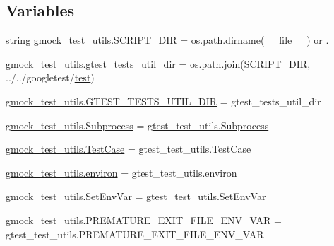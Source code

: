 \subsection*{Variables}
\begin{DoxyCompactItemize}
\item 
string \mbox{\hyperlink{namespacegmock__test__utils_a4ef94affd9d889f78d67be80017eeddd}{gmock\+\_\+test\+\_\+utils.\+S\+C\+R\+I\+P\+T\+\_\+\+D\+IR}} = os.\+path.\+dirname(\+\_\+\+\_\+file\+\_\+\+\_\+) or \textquotesingle{}.\textquotesingle{}
\item 
\mbox{\hyperlink{namespacegmock__test__utils_af6d94170502149e7f99cfa73ddc13c00}{gmock\+\_\+test\+\_\+utils.\+gtest\+\_\+tests\+\_\+util\+\_\+dir}} = os.\+path.\+join(S\+C\+R\+I\+P\+T\+\_\+\+D\+IR, \textquotesingle{}../../googletest/\mbox{\hyperlink{_mutual_8h_a707ee03719e99670bf6cfdfd897b8456}{test}}\textquotesingle{})
\item 
\mbox{\hyperlink{namespacegmock__test__utils_ae7ee9324ba489b3cbd99c5e26006eba9}{gmock\+\_\+test\+\_\+utils.\+G\+T\+E\+S\+T\+\_\+\+T\+E\+S\+T\+S\+\_\+\+U\+T\+I\+L\+\_\+\+D\+IR}} = gtest\+\_\+tests\+\_\+util\+\_\+dir
\item 
\mbox{\hyperlink{namespacegmock__test__utils_a31a0e33565ec805d314cb0a4eb8317e6}{gmock\+\_\+test\+\_\+utils.\+Subprocess}} = \mbox{\hyperlink{classgtest__test__utils_1_1_subprocess}{gtest\+\_\+test\+\_\+utils.\+Subprocess}}
\item 
\mbox{\hyperlink{namespacegmock__test__utils_a959c5af591e4d49b6d35745205b64509}{gmock\+\_\+test\+\_\+utils.\+Test\+Case}} = gtest\+\_\+test\+\_\+utils.\+Test\+Case
\item 
\mbox{\hyperlink{namespacegmock__test__utils_a6f0938b5e8839ebc847b52a38f4d35e3}{gmock\+\_\+test\+\_\+utils.\+environ}} = gtest\+\_\+test\+\_\+utils.\+environ
\item 
\mbox{\hyperlink{namespacegmock__test__utils_ab0c69f8ce649fdd5a17f99deedf3eb29}{gmock\+\_\+test\+\_\+utils.\+Set\+Env\+Var}} = gtest\+\_\+test\+\_\+utils.\+Set\+Env\+Var
\item 
\mbox{\hyperlink{namespacegmock__test__utils_a9392c288e6da3024d65ec0bddc0d86c3}{gmock\+\_\+test\+\_\+utils.\+P\+R\+E\+M\+A\+T\+U\+R\+E\+\_\+\+E\+X\+I\+T\+\_\+\+F\+I\+L\+E\+\_\+\+E\+N\+V\+\_\+\+V\+AR}} = gtest\+\_\+test\+\_\+utils.\+P\+R\+E\+M\+A\+T\+U\+R\+E\+\_\+\+E\+X\+I\+T\+\_\+\+F\+I\+L\+E\+\_\+\+E\+N\+V\+\_\+\+V\+AR
\end{DoxyCompactItemize}
